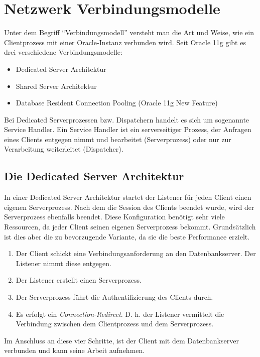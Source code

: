     \section{Netzwerk Verbindungsmodelle}
    \label{connectionmodels}
      Unter dem Begriff \enquote{Verbindungsmodell} versteht man die Art und Weise, wie ein Clientprozess mit einer Oracle-Instanz verbunden wird. Seit Oracle 11g gibt es drei verschiedene Verbindungsmodelle:

      \begin{itemize}
        \item Dedicated Server Architektur
        \item Shared Server Architektur
        \item Database Resident Connection Pooling (Oracle 11g New Feature)
      \end{itemize}

      \begin{merke}
        Bei Dedicated Serverprozessen bzw. Dispatchern handelt es sich um sogenannte Service Handler. Ein Service Handler ist ein serverseitiger Prozess, der Anfragen eines Clients entgegen nimmt und bearbeitet (Serverprozess) oder nur zur Verarbeitung weiterleitet (Dispatcher).
      \end{merke}
      \subsection{Die Dedicated Server Architektur}
        In einer Dedicated Server Architektur startet der Listener für jeden Client einen eigenen Serverprozess. Nach dem die Session des Clients beendet wurde, wird der Serverprozess ebenfalls beendet. Diese Konfiguration benötigt sehr viele Ressourcen, da jeder Client seinen eigenen Serverprozess bekommt. Grundsätzlich ist dies aber die zu bevorzugende Variante, da sie die beste Performance erzielt.
        \begin{enumerate}
          \item Der Client schickt eine Verbindungsanforderung an den Datenbankserver. Der Listener nimmt diese entgegen.
          \item Der Listener erstellt einen Serverprozess.
          \item Der Serverprozess führt die Authentifizierung des Clients durch.
          \item Es erfolgt ein \textit{Connection-Redirect}. D. h. der Listener vermittelt die Verbindung zwischen dem Clientprozess und dem Serverprozess.
        \end{enumerate}
        Im Anschluss an diese vier Schritte, ist der Client mit dem Datenbankserver verbunden und kann seine Arbeit aufnehmen.
